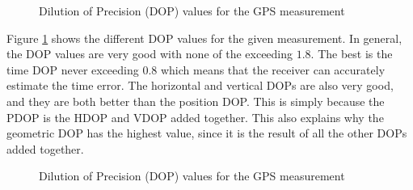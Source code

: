 \documentclass{article}
\begin{document}
\begin{figure}[!ht]
    \centering
    \caption{Dilution of Precision (DOP) values for the GPS measurement}
    \label{fig:dop}
\end{figure}

Figure \ref{fig:dop} shows the different DOP values for the given measurement. In general, the DOP values are very good with none of the exceeding $1.8$. The best is the time DOP never exceeding $0.8$ which means that the receiver can accurately estimate the time error. The horizontal and vertical DOPs are also very good, and they are both better than the position DOP. This is simply because the PDOP is the HDOP and VDOP added together. This also explains why the geometric DOP has the highest value, since it is the result of all the other DOPs added together.

\begin{figure}[!ht]
    \centering
    \caption{Dilution of Precision (DOP) values for the GPS measurement}
    \label{fig:no_satellites}
\end{figure}
\end{document}
